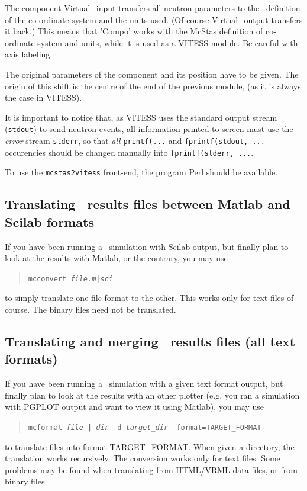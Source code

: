 The component Virtual\_input transfers all neutron parameters to the \MCS\ definition of the co-ordinate system and the units used. (Of course Virtual\_output transfers it back.) This means that 'Compo' works with the McStas definition of co-ordinate system and units, while it is used as a VITESS module. Be careful with axis labeling.

The original parameters of the component and its position have to be given. The origin of this shift is the centre of the end of the previous module, (as it is always the case in VITESS).

It is important to notice that, as VITESS uses the standard output stream (\verb+stdout+) to send neutron events, all information printed to screen must use the \emph{error} stream \verb+stderr+, so that \emph{all} \verb+printf(...+ and \verb+fprintf(stdout, ...+ occurencies should be changed manually into \verb+fprintf(stderr, ...+.

To use the \verb+mcstas2vitess+ front-end, the program Perl should be available.

\subsection{Translating \MCS\ results files between Matlab and Scilab formats}
\label{s:mcconvert}
 

If you have been running a \MCS\ simulation with Scilab output, but finally plan to look at the results with Matlab, or the contrary, you may use
\begin{quote}
  \texttt{mcconvert {\it file.{m|sci}\/}}
\end{quote}
to simply translate one file format to the other. This works only for text files of course. The binary files need not be translated.

\subsection{Translating and merging \MCS\ results files (all text formats)}
\label{s:mcformat}
    

If you have been running a \MCS\ simulation with a given text format output, but finally plan to look at the results with an other plotter (e.g. you ran a simulation with PGPLOT output and want to view it using Matlab), you may use
\begin{quote}
  \texttt{mcformat {\it file | dir} -d {\it target\_dir} --format=TARGET\_FORMAT}
\end{quote}
to translate files into format TARGET\_FORMAT. When given a directory, the translation works recursively. The conversion works only for text files. Some problems may be found when translating from HTML/VRML data files, or from binary files.

